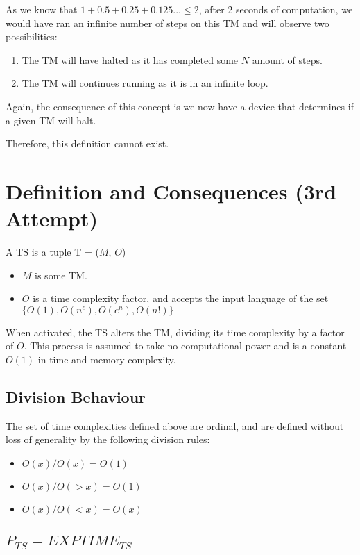 \documentclass{report}
\begin{document}
As we know that $1 + 0.5 + 0.25 + 0.125 ... \le 2$, after 2 seconds of computation, we would have ran an infinite number of steps on this TM and will observe two possibilities:

\begin{enumerate}
  \item The TM will have halted as it has completed some $N$ amount of steps.
  \item The TM will continues running as it is in an infinite loop.
\end{enumerate}

Again, the consequence of this concept is we now have a device that determines if a given TM will halt.

Therefore, this definition cannot exist.

\newpage
\section{Definition and Consequences (3rd Attempt)}

A TS is a tuple T = ($M$, $O$)

\begin{itemize}
  \item $M$ is some TM.
  \item $O$ is a time complexity factor, and accepts the input language of the set $\{O(1), O(n^c), O(c^n), O(n!)\}$
\end{itemize}

When activated, the TS alters the TM, dividing its time complexity by a factor of $O$. This process is assumed to take no computational power and is a constant $O(1)$ in time and memory complexity.

\subsection{Division Behaviour}

The set of time complexities defined above are ordinal, and are defined without loss of generality by the following division rules:

\begin{itemize}
  \item $O(x)/O(x) = O(1)$
  \item $O(x)/O(>x) = O(1)$
  \item $O(x)/O(<x) = O(x)$
\end{itemize}

\subsection{$P_{TS} = EXPTIME_{TS}$}
\end{document}
